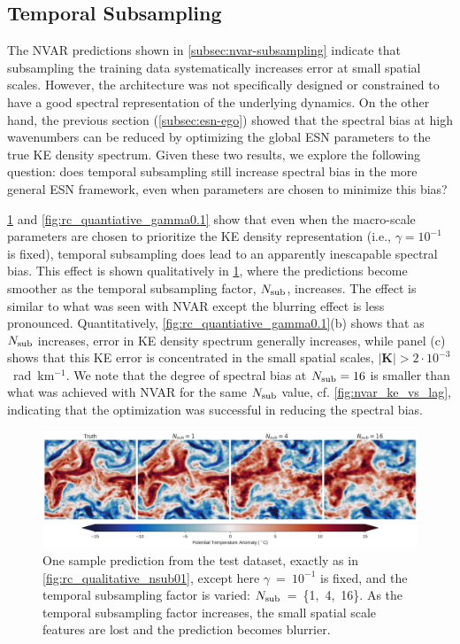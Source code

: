 \documentclass[draft]{agujournal2019}
\begin{document}
\subsection{Temporal Subsampling}
\label{subsec:esn-subsampling}


The NVAR predictions shown in \cref{subsec:nvar-subsampling} indicate that
subsampling the training data systematically increases error at small spatial
scales.
However, the architecture was not specifically designed or constrained to
have a good spectral representation of the underlying dynamics.
On the other hand, the previous section (\cref{subsec:esn-ego})
showed that the spectral bias at high wavenumbers
can be reduced by optimizing the global ESN parameters
to the true KE density spectrum.
Given these two results, we explore the following question: does temporal subsampling still
increase spectral bias in the more general ESN framework, even when parameters
are chosen to minimize this bias?

\cref{fig:rc_qualitative_gamma0.1} and \cref{fig:rc_quantiative_gamma0.1}
show that even when the macro-scale parameters are chosen to prioritize the KE
density representation (i.e., $\gamma = 10^{-1}$ is fixed),
temporal subsampling does lead to an apparently inescapable spectral bias.
This effect is shown qualitatively in \cref{fig:rc_qualitative_gamma0.1},
where the predictions become
smoother as the temporal subsampling factor, $N_\text{sub}$, increases.
The effect is similar to what was seen with NVAR except the blurring effect is
less pronounced.
Quantitatively, \cref{fig:rc_quantiative_gamma0.1}(b) shows that as $N_\text{sub}$
increases, error in KE density spectrum generally increases, while panel (c) shows that this KE
error is concentrated in the small spatial scales,
$|\mathbf{K}| > 2\cdot10^{-3}$~rad~km$^{-1}$.
We note that the degree of spectral bias at $N_\text{sub}=16$ is smaller than what was
achieved with NVAR for the same $N_\text{sub}$ value, cf. \cref{fig:nvar_ke_vs_lag},
indicating that the optimization was successful in reducing the spectral bias.

\begin{figure}
    \centering
    \includegraphics[width=\textwidth]{figures/rc_qualitative_nsub.jpg}
    \caption{One sample prediction from the test dataset, exactly as in
        \cref{fig:rc_qualitative_nsub01}, except here $\gamma$~=~$10^{-1}$ is fixed, and
        the temporal subsampling factor is varied: $N_\text{sub}$~=~\{1,~4,~16\}.
        As the temporal subsampling factor increases, the small spatial scale
        features are lost and the prediction becomes blurrier.
    }
    \label{fig:rc_qualitative_gamma0.1}
\end{figure}
\end{document}
